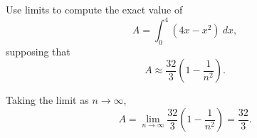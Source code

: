 \begin{example} %
Use limits to compute the exact value of
\[ A = \int_0^4 (4x-x^2) \ dx, \]
supposing that 
\[ A \approx \frac{32}{3}\left(1-\frac{1}{n^2}\right). \]

\solution Taking the limit as $n \to \infty$, 
\[ A = \lim_{n \to \infty} \frac{32}{3} \left( 1-\frac{1}{n^2} \right) = \frac{32}{3}. \]
\end{example}